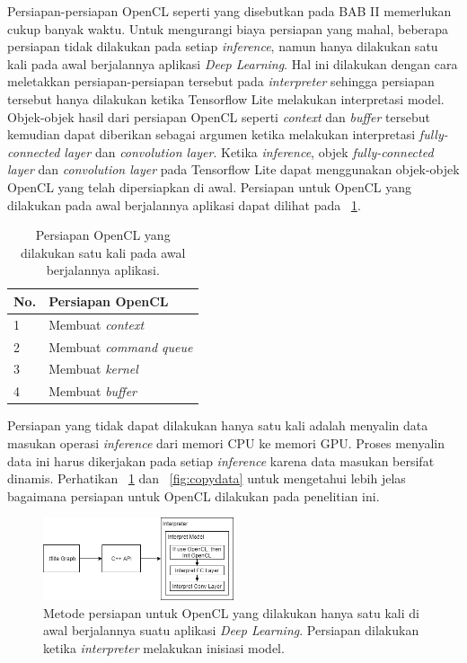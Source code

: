 Persiapan-persiapan OpenCL seperti yang disebutkan pada BAB II memerlukan cukup banyak waktu. Untuk mengurangi biaya persiapan yang mahal, beberapa persiapan tidak dilakukan pada setiap \textit{inference}, namun hanya dilakukan satu kali pada awal berjalannya aplikasi \textit{Deep Learning}. Hal ini dilakukan dengan cara meletakkan persiapan-persiapan tersebut pada \textit{interpreter} sehingga persiapan tersebut hanya dilakukan ketika Tensorflow Lite melakukan interpretasi model. Objek-objek hasil dari persiapan OpenCL seperti \textit{context} dan \textit{buffer} tersebut kemudian dapat diberikan sebagai argumen ketika melakukan interpretasi \textit{fully-connected layer} dan \textit{convolution layer}. Ketika \textit{inference}, objek \textit{fully-connected layer} dan \textit{convolution layer} pada Tensorflow Lite dapat menggunakan objek-objek OpenCL yang telah dipersiapkan di awal. Persiapan untuk OpenCL yang dilakukan pada awal berjalannya aplikasi dapat dilihat pada \tab~\ref{tab:SetupCL}.

\begin{table}
	\centering
	\caption{Persiapan OpenCL yang dilakukan satu kali pada awal berjalannya aplikasi.}
	\label{tab:SetupCL}
	\begin{tabular}{| l | l |}
		\hline
		\textbf{No.} & \textbf{Persiapan OpenCL} \\ 
		\hline
		1 & Membuat \textit{context} \\ 
		\hline 
		2 & Membuat \textit{command queue} \\ 
		\hline 
		3 & Membuat \textit{kernel} \\ 
		\hline
		4 & Membuat \textit{buffer} \\ 
		\hline
	\end{tabular}
\end{table}

Persiapan yang tidak dapat dilakukan hanya satu kali adalah menyalin data masukan operasi \textit{inference} dari memori CPU ke memori GPU. Proses menyalin data ini harus dikerjakan pada setiap \textit{inference} karena data masukan bersifat dinamis. Perhatikan \pic~\ref{fig:initcl} dan \pic~\ref{fig:copydata} untuk mengetahui lebih jelas bagaimana persiapan untuk OpenCL dilakukan pada penelitian ini.

\begin{figure}
	\centering
	\includegraphics[width=0.50\textwidth]
	{pics/initcl.png}
	\caption{Metode persiapan untuk OpenCL yang dilakukan hanya satu kali di awal berjalannya suatu aplikasi \textit{Deep Learning}. Persiapan dilakukan ketika \textit{interpreter} melakukan inisiasi model.}
	\label{fig:initcl}
\end{figure}

